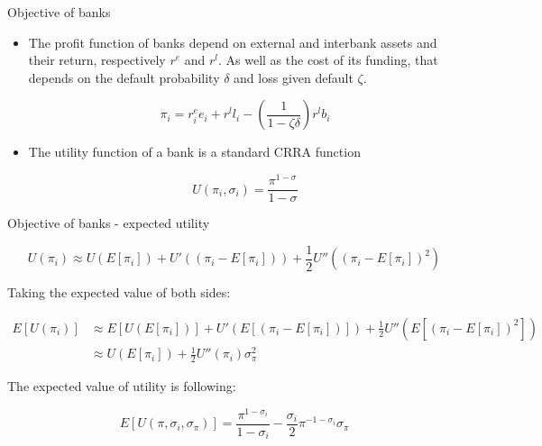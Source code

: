 \documentclass{beamer}
\begin{document}
\begin{frame}{Objective of banks}

    \begin{itemize}
        \item The profit function of banks depend on external and interbank assets and their return, respectively $r^e$ and $r^l$. As well as the cost of its funding, that depends on the default probability $\delta$ and loss given default $\zeta$.
        
        \[\pi_i = r_{i}^e e_i + r^l l_i - \left(\frac{1}{1 - \zeta \delta}\right) r^l b_i\]

        \item The utility function of a bank is a standard CRRA function
        
        \[U(\pi_i, \sigma_i) = \frac{\pi^{1-\sigma}}{1 - \sigma}\]


    \end{itemize}
    
\end{frame}

\begin{frame}{Objective of banks - expected utility}

    \[U(\pi_i) \approx U(E[\pi_i]) + U'((\pi_i - E[\pi_i])) + \frac{1}{2} U''((\pi_i - E[\pi_i])^2)\]

Taking the expected value of both sides:

\begin{equation}
  \begin{aligned}
    E[U(\pi_i)] &\approx E[U(E[\pi_i])] + U'(E[(\pi_i - E[\pi_i])]) + \frac{1}{2} U''(E[(\pi_i - E[\pi_i])^2]) \\
     &\approx U(E[\pi_i]) + \frac{1}{2} U''(\pi_i) \sigma^2_{\pi}
  \end{aligned}\nonumber
\end{equation}

The expected value of utility is following:

\[ E[U(\pi, \sigma_i, \sigma_\pi)] = \frac{\pi^{1-\sigma_i}}{1 - \sigma_i} - \frac{\sigma_i}{2} \pi^{-1-\sigma_i} \sigma_\pi\]

\end{frame}
\end{document}
